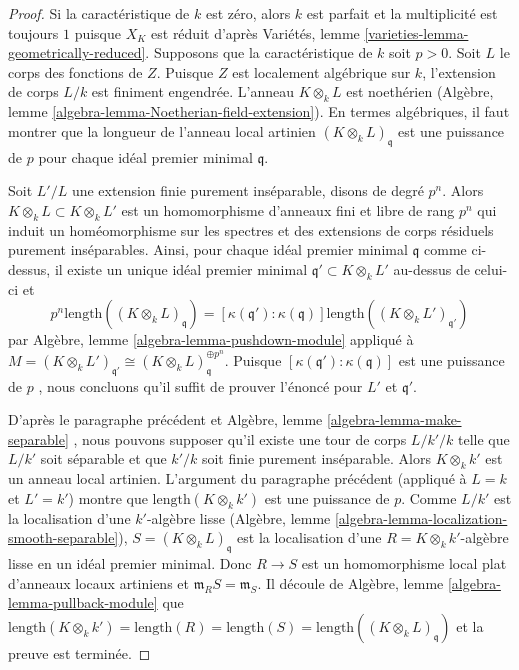 \begin{proof}
 Si la caractéristique de  $k$  est zéro, alors  $k$  est parfait et 
la multiplicité est toujours  $1$  puisque $X_K$ est réduit d'après
 Variétés, lemme  \ref{varieties-lemma-geometrically-reduced}. 
Supposons que la caractéristique de  $k$ soit  $p > 0$. 
Soit  $L$  le corps des fonctions de  $Z$. Puisque  $Z$  est localement algébrique
 sur  $k$, l'extension de corps $L/k$ est finiment engendrée. 
L'anneau  $K \otimes_k L$  est noethérien
 (Algèbre, lemme  \ref{algebra-lemma-Noetherian-field-extension}).
 En termes algébriques, il faut montrer que la longueur de l'anneau
 local artinien  $(K \otimes_k L)_\mathfrak q$
  est une puissance de  $p$ pour chaque idéal premier minimal  $\mathfrak q$. 

\medskip\noindent
 Soit  $L'/L$  une extension finie purement inséparable, disons de degré 
$p^n$. Alors  $K \otimes_k L \subset K \otimes_k L'$  est un homomorphisme
 d'anneaux fini et libre de rang $p^n$  qui induit un homéomorphisme sur les 
spectres et des extensions de corps résiduels purement inséparables. 
Ainsi, pour chaque idéal premier minimal $\mathfrak q$  comme ci-dessus,
 il existe un unique idéal premier minimal 
$\mathfrak q' \subset K \otimes_k L'$  au-dessus de celui-ci et 
$$
p^n \text{length}((K \otimes_k L)_\mathfrak q) =
[\kappa(\mathfrak q') : \kappa(\mathfrak q)]
\text{length}((K \otimes_k L')_{\mathfrak q'})
$$
 par Algèbre, lemme  \ref{algebra-lemma-pushdown-module}  appliqué 
à  $M = (K \otimes_k L')_{\mathfrak q'} \cong
(K \otimes_k L)_{\mathfrak q}^{\oplus p^n}$. 
Puisque  $[\kappa(\mathfrak q') : \kappa(\mathfrak q)]$  est une puissance
 de  $p$ , nous concluons qu'il suffit de prouver 
l'énoncé pour  $L'$  et  $\mathfrak q'$. 

\medskip\noindent
 D'après le paragraphe précédent et Algèbre, lemme  \ref{algebra-lemma-make-separable} , nous 
pouvons supposer qu'il existe une tour de corps $L/k'/k$ telle que $L/k'$ soit séparable et
 que $k'/k$ soit finie purement inséparable. Alors  $K \otimes_k k'$ est 
un anneau local artinien. L'argument du paragraphe précédent 
(appliqué à $L = k$  et  $L' = k'$) montre que  $\text{length}(K \otimes_k k')$
  est une puissance de $p$. Comme $L/k'$ est la localisation 
d'une $k'$-algèbre 
lisse (Algèbre, lemme \ref{algebra-lemma-localization-smooth-separable}),
 $S = (K \otimes_k L)_\mathfrak q$ est la localisation d'une 
$R = K \otimes_k k'$-algèbre lisse en un idéal premier minimal.
 Donc  $R \to S$  est un homomorphisme local plat d'anneaux 
locaux artiniens et  $\mathfrak m_R S = \mathfrak m_S$. Il
 découle de Algèbre, lemme  \ref{algebra-lemma-pullback-module}  que  
$\text{length}(K \otimes_k k') = \text{length}(R) =
\text{length}(S) = \text{length}((K \otimes_k L)_\mathfrak q)$
  et la preuve est terminée. 
\end{proof} 

